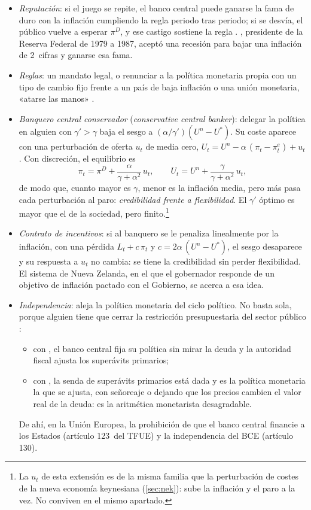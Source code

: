 \documentclass[11pt]{article}
\begin{document}
\begin{itemize}
\item \emph{Reputación}: si el juego se repite, el banco central puede ganarse la fama de duro con la inflación cumpliendo la regla periodo tras periodo; si se desvía, el público vuelve a esperar $\pi^D$, y ese castigo sostiene la regla\nocite{BarroGordon1983Rules} . , presidente de la Reserva Federal de 1979 a 1987, aceptó una recesión para bajar una inflación de 2~cifras y ganarse esa fama\nocite{FedHistory2026Volcker}.
\item \emph{Reglas}: un mandato legal, o renunciar a la política monetaria propia con un tipo de cambio fijo frente a un país de baja inflación o una unión monetaria, «atarse las manos»\nocite{GiavazziPagano1988Advantage}  .
\item \emph{Banquero central conservador} (\emph{conservative central banker})\nocite{Rogoff1985Optimal}: delegar la política en alguien con $\gamma'>\gamma$ baja el sesgo a $(\alpha/\gamma')(U^n-U^*)$. Su coste aparece con una perturbación de oferta $u_t$ de media cero, $U_t=U^n-\alpha\,(\pi_t-\pi^e_t)+u_t$. Con discreción, el equilibrio es
  $$\pi_t=\pi^D+\frac{\alpha}{\gamma+\alpha^2}\,u_t,\qquad U_t=U^n+\frac{\gamma}{\gamma+\alpha^2}\,u_t ,$$
  de modo que, cuanto mayor es $\gamma$, menor es la inflación media, pero más pasa cada perturbación al paro: \emph{credibilidad frente a flexibilidad}. El $\gamma'$ óptimo es mayor que el de la sociedad, pero finito.\footnote{La $u_t$ de esta extensión es de la misma familia que la perturbación de costes de la nueva economía keynesiana (\ref{sec:nek}): sube la inflación y el paro a la vez. No conviven en el mismo apartado.}
\item \emph{Contrato de incentivos}\nocite{Walsh1995Optimal}: si al banquero se le penaliza linealmente por la inflación, con una pérdida $L_t+c\,\pi_t$ y $c=2\alpha\,(U^n-U^*)$, el sesgo desaparece y su respuesta a $u_t$ no cambia: se tiene la credibilidad sin perder flexibilidad. El sistema de Nueva Zelanda, en el que el gobernador responde de un objetivo de inflación pactado con el Gobierno, se acerca a esa idea.
\item \emph{Independencia}: aleja la política monetaria del ciclo político. No basta sola, porque alguien tiene que cerrar la restricción presupuestaria del sector público\nocite{SargentWallace1981Some} :
  \begin{itemize}
  \item con , el banco central fija su política sin mirar la deuda y la autoridad fiscal ajusta los superávits primarios;
  \item con , la senda de superávits primarios está dada y es la política monetaria la que se ajusta, con señoreaje o dejando que los precios cambien el valor real de la deuda: es la aritmética monetarista desagradable.
  \end{itemize}
  De ahí, en la Unión Europea, la prohibición de que el banco central financie a los Estados (artículo 123~del TFUE) y la independencia del BCE (artículo 130).
\end{itemize}
\end{document}
